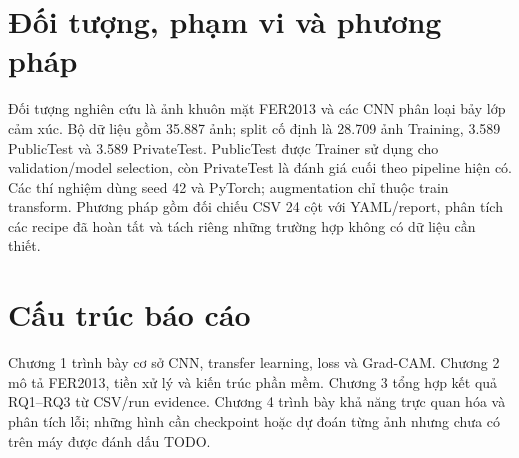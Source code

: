 \section{Đối tượng, phạm vi và phương pháp}
Đối tượng nghiên cứu là ảnh khuôn mặt FER2013 và các CNN phân loại bảy lớp cảm xúc. Bộ dữ liệu gồm 35.887 ảnh; split cố định là 28.709 ảnh Training, 3.589 PublicTest và 3.589 PrivateTest. PublicTest được Trainer sử dụng cho validation/model selection, còn PrivateTest là đánh giá cuối theo pipeline hiện có. Các thí nghiệm dùng seed 42 và PyTorch; augmentation chỉ thuộc train transform. Phương pháp gồm đối chiếu CSV 24 cột với YAML/report, phân tích các recipe đã hoàn tất và tách riêng những trường hợp không có dữ liệu cần thiết.

\section{Cấu trúc báo cáo}
Chương 1 trình bày cơ sở CNN, transfer learning, loss và Grad-CAM. Chương 2 mô tả FER2013, tiền xử lý và kiến trúc phần mềm. Chương 3 tổng hợp kết quả RQ1--RQ3 từ CSV/run evidence. Chương 4 trình bày khả năng trực quan hóa và phân tích lỗi; những hình cần checkpoint hoặc dự đoán từng ảnh nhưng chưa có trên máy được đánh dấu TODO.